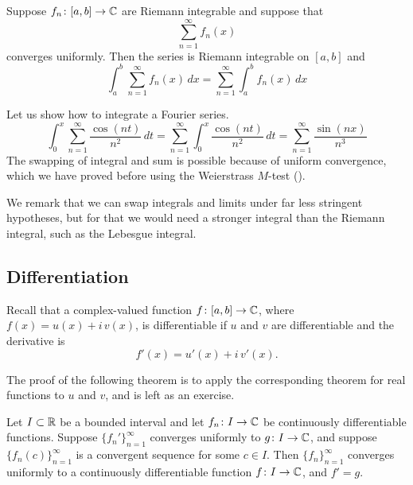 \begin{cor}
\pagebreak[2]
Suppose $f_n \colon [a,b] \to {\mathbb{C}}$
are Riemann integrable and suppose that
\begin{equation*}
\sum_{n=1}^\infty f_n(x)
\end{equation*}
converges uniformly.  Then the series is Riemann integrable on $[a,b]$
and
\begin{equation*}
\int_a^b \sum_{n=1}^\infty f_n(x) \,dx
=
\sum_{n=1}^\infty \int_a^b f_n(x) \,dx
\end{equation*}
\end{cor}

\begin{example}
Let us show how to integrate a Fourier series.
\begin{equation*}
\int_{0}^x \sum_{n=1}^\infty \frac{\cos(nt)}{n^2} \,dt
=
\sum_{n=1}^\infty \int_{0}^x \frac{\cos(nt)}{n^2}\,dt
=
\sum_{n=1}^\infty \frac{\sin(nx)}{n^3}
\end{equation*}
The swapping of integral and sum is possible because of uniform convergence,
which we have proved before using the Weierstrass $M$-test
().
\end{example}

We remark that we can swap integrals and limits under far less stringent hypotheses,
but for that we would need a stronger integral than the Riemann integral,
such as the Lebesgue integral.

\subsection{Differentiation}

Recall that a complex-valued function
$f \colon [a,b] \to {\mathbb{C}}$, where $f(x) = u(x)+i\,v(x)$,
is differentiable if $u$ and $v$ are differentiable
and the derivative is
\begin{equation*}
f'(x) = u'(x)+i\,v'(x) .
\end{equation*}

The proof of the following theorem is to apply the corresponding theorem for
real functions to $u$ and $v$, and is left as an exercise.

\begin{thm} \label{thm:dersconvergecomplex}
Let $I \subset {\mathbb{R}}$ be a bounded interval and let
$f_n \colon I \to {\mathbb{C}}$ be continuously differentiable functions.
Suppose $\{ f_n' \}_{n=1}^\infty$ converges uniformly to $g \colon I \to {\mathbb{C}}$,
and suppose $\{ f_n(c) \}_{n=1}^\infty$ is a
convergent sequence for some $c \in I$.  Then $\{ f_n \}_{n=1}^\infty$ converges uniformly to 
a continuously differentiable function $f \colon I \to {\mathbb{C}}$, and $f' = g$.
\end{thm}

